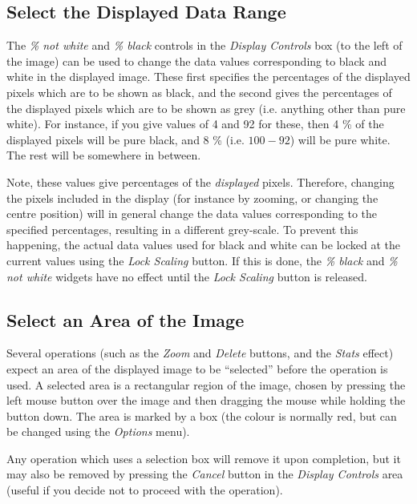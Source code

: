 \documentclass[11pt]{article}
\newcommand{\htmlref}[2]{#1}
\newcommand{\xlabel}[1]{}
\newcommand{\mylabel}[1] {\xlabel{#1}\label{#1}}
\begin{document}
\subsection {\mylabel{POLKA_IMAGE_SCALING}Select the Displayed Data Range}
The \htmlref{\emph{\% not white}}{POLKA_WHITE} and \htmlref{\emph{\% black}}
{POLKA_BLACK} controls in the \htmlref{\emph{Display Controls}}
{POLKA_DISPLAY_CONTROLS} box (to the left of the image) can be used to
change the data values corresponding to black and white in the displayed
image. These first specifies the percentages of the displayed pixels
which are to be shown as black, and the second gives the percentages of the
displayed pixels which are to be shown as grey (i.e. anything other than
pure white). For instance, if you give values of 4 and 92 for these, then
4 \% of the displayed pixels will be pure black, and 8 \% (i.e. $100-92$)
will be pure white. The rest will be somewhere in between.

Note, these values give percentages of the \emph{displayed} pixels.
Therefore, changing the pixels included in the display (for instance by
zooming, or changing the centre position) will in general change the data
values corresponding to the specified percentages, resulting in a
different grey-scale. To prevent this happening, the actual data values
used for black and white can be locked at the current values using the
\htmlref{\emph{Lock Scaling}}{POLKA_LOCK_SCALING} button. If this is done,
the \emph{\% black} and \emph{\% not white} widgets have no effect until the
\emph{Lock Scaling} button is released.

\subsection {\mylabel{POLKA_AREA_SELECTION}Select an Area of the Image}
Several operations (such as the \htmlref{\emph{Zoom}}{POLKA_ZOOM} and
\htmlref{\emph{Delete}}{POLKA_DELETE} buttons, and the \htmlref{{\em
Stats}}{POLKA_STATS_EFFECT} effect) expect an area of the displayed image
to be ``selected'' before the operation is used. A selected area is a
rectangular region of the image, chosen by pressing the left mouse button
over the image and then dragging the mouse while holding the button down.
The area is marked by a box (the colour is normally red, but can be
changed using the \htmlref{\emph{Options}}{POLKA_OPTIONS_MENU} menu).

Any operation which uses a selection box will remove it upon completion,
but it may also be removed by pressing the \htmlref{\emph{Cancel}}{POLKA_CANCEL}
button in the \htmlref{\emph{Display Controls}}{POLKA_DISPLAY_CONTROLS} area
(useful if you decide not to proceed with the operation).
\end{document}
